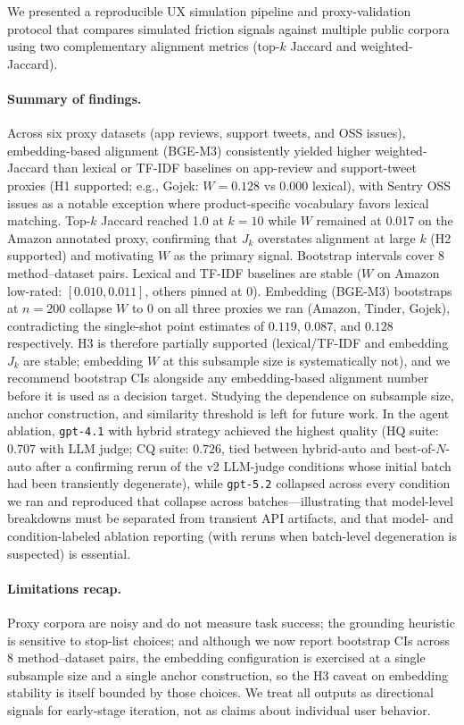 We presented a reproducible UX simulation pipeline and proxy-validation protocol
that compares simulated friction signals against multiple public corpora using two complementary alignment metrics (top-$k$ Jaccard and weighted-Jaccard).

\paragraph{Summary of findings.}
Across six proxy datasets (app reviews, support tweets, and OSS issues), embedding-based alignment (BGE-M3) consistently yielded higher weighted-Jaccard than lexical or TF-IDF baselines on app-review and support-tweet proxies (H1 supported; e.g., Gojek: $W=0.128$ vs $0.000$ lexical), with Sentry OSS issues as a notable exception where product-specific vocabulary favors lexical matching.
Top-$k$ Jaccard reached 1.0 at $k=10$ while $W$ remained at 0.017 on the Amazon annotated proxy, confirming that $J_k$ overstates alignment at large $k$ (H2 supported) and motivating $W$ as the primary signal.
Bootstrap intervals cover $8$ method--dataset pairs. Lexical and TF-IDF baselines are stable ($W$ on Amazon low-rated: $[0.010, 0.011]$, others pinned at $0$). Embedding (BGE-M3) bootstraps at $n=200$ collapse $W$ to $0$ on all three proxies we ran (Amazon, Tinder, Gojek), contradicting the single-shot point estimates of $0.119$, $0.087$, and $0.128$ respectively. H3 is therefore partially supported (lexical/TF-IDF and embedding $J_k$ are stable; embedding $W$ at this subsample size is systematically not), and we recommend bootstrap CIs alongside any embedding-based alignment number before it is used as a decision target. Studying the dependence on subsample size, anchor construction, and similarity threshold is left for future work.
In the agent ablation, \texttt{gpt-4.1} with hybrid strategy achieved the highest quality (HQ suite: $0.707$ with LLM judge; CQ suite: $0.726$, tied between hybrid-auto and best-of-$N$-auto after a confirming rerun of the v2 LLM-judge conditions whose initial batch had been transiently degenerate), while \texttt{gpt-5.2} collapsed across every condition we ran and reproduced that collapse across batches---illustrating that model-level breakdowns must be separated from transient API artifacts, and that model- and condition-labeled ablation reporting (with reruns when batch-level degeneration is suspected) is essential.

\paragraph{Limitations recap.}
Proxy corpora are noisy and do not measure task success; the grounding heuristic is sensitive to stop-list choices; and although we now report bootstrap CIs across $8$ method--dataset pairs, the embedding configuration is exercised at a single subsample size and a single anchor construction, so the H3 caveat on embedding stability is itself bounded by those choices.
We treat all outputs as directional signals for early-stage iteration, not as claims about individual user behavior.

